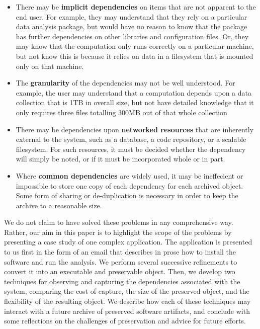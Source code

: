 \documentclass{acm_proc_article-sp}
\begin{document}
\begin{itemize}
\item There may be {\bf implicit dependencies} on items that are
not apparent to the end user.  For example, they may understand that
they rely on a particular data analysis package, but would have
no reason to know that the package has further dependencies on
other libraries and configuration files.  Or, they may know that
the computation only runs correctly on a particular machine, but
not know this is because it relies on data in a filesystem that
is mounted only on that machine.

\item The {\bf granularity} of the dependencies may not be well understood.
For example, the user may understand that a computation depends upon
a data collection that is 1TB in overall size, but not have detailed
knowledge that it only requires three files totalling 300MB out of that
whole collection

\item There may be dependencies upon {\bf networked resources} that
are inherently external to the system, such as a database, a code
repository, or a scalable filesystem.  For such resources, it
must be decided whether the dependency will simply be noted, or if it
must be incorporated whole or in part.

\item Where {\bf common dependencies} are widely used, it may be ineffecient or
impossible to store one copy of each dependency for each archived object.
Some form of sharing or de-duplication is necessary in order to keep
the archive to a reasonable size.
\end{itemize}

We do not claim to have solved these problems in any comprehensive
way.  Rather, our aim in this paper is to highlight the scope
of the problems by presenting a case study of one complex application.
The application is presented to us
first in the form of an email that describes in prose how to install
the software and run the analysis.  We perform several successive
refinements to convert it into an executable and preservable object.
Then, we develop two techniques for observing and capturing the
dependencies associated with the system, comparing the cost of capture,
the size of the preserved object, and the flexibility of the resulting
object.  We describe how each of these techniques may interact with
a future archive of preserved software artifacts, and conclude with
some reflections on the challenges of preservation and advice for future efforts.
\end{document}
